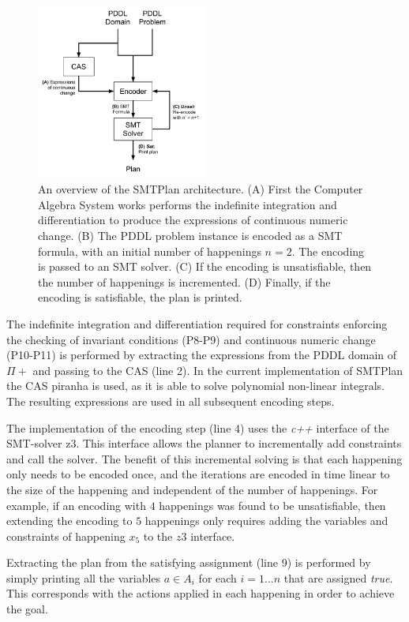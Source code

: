 \begin{figure}[ht]
\centering
\includegraphics[width=0.50\textwidth]{diagrams/architecture.pdf}
\caption{An overview of the SMTPlan architecture. (A) First the Computer Algebra System works performs the indefinite integration and differentiation to produce the expressions of continuous numeric change. (B) The PDDL problem instance is encoded as a SMT formula, with an initial number of happenings $n=2$. The encoding is passed to an SMT solver. (C) If the encoding is unsatisfiable, then the number of happenings is incremented. (D) Finally, if the encoding is satisfiable, the plan is printed. }
\label{fig:SMTPlan}
\end{figure}

The indefinite integration and differentiation required for constraints enforcing the checking of invariant conditions (P8-P9) and continuous numeric change (P10-P11) is performed by extracting the expressions from the PDDL domain of $\Pi+$ and passing to the CAS (line 2). In the current implementation of {\sc SMTPlan} the CAS {\sc piranha} is used, as it is able to solve polynomial non-linear integrals. The resulting expressions are used in all subsequent encoding steps.

The implementation of the encoding step (line 4) uses the \textit{c++} interface of the SMT-solver {\sc z3}. This interface allows the planner to incrementally add constraints and call the solver. The benefit of this incremental solving is that each happening only needs to be encoded once, and the iterations are encoded in time linear to the size of the happening and independent of the number of happenings. For example, if an encoding with $4$ happenings was found to be unsatisfiable, then extending the encoding to $5$ happenings only requires adding the variables and constraints of happening $x_5$ to the $z3$ interface.

Extracting the plan from the satisfying assignment (line 9) is performed by simply printing all the variables $a\in A_i$ for each $i=1\ldots n$ that are assigned \textit{true}. This corresponds with the actions applied in each happening in order to achieve the goal.

